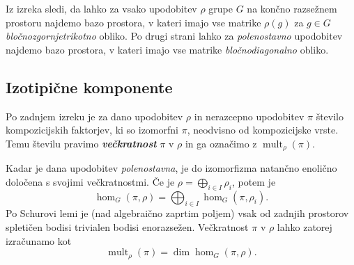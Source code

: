 \documentclass[11pt]{book}
\DeclareMathOperator\mult{mult}
\def\definicija{\color{rdeca}\bf\em}
\theoremstyle{definition}
\theoremstyle{zgled}
\theoremstyle{odprtproblem}
\theoremstyle{domacanaloga}
\theoremstyle{izrek}
\begin{document}
Iz izreka sledi, da lahko za vsako upodobitev $\rho$ grupe $G$ na končno razsežnem prostoru najdemo bazo prostora, v kateri imajo vse matrike $\rho(g)$ za $g \in G$ \emph{bločnozgornjetrikotno} obliko. Po drugi strani lahko za \emph{polenostavno} upodobitev najdemo bazo prostora, v kateri imajo vse matrike \emph{bločnodiagonalno} obliko.

\subsection{Izotipične komponente}

Po zadnjem izreku je za dano upodobitev $\rho$ in nerazcepno upodobitev $\pi$ število kompozicijskih faktorjev, ki so izomorfni $\pi$, neodvisno od kompozicijske vrste. Temu številu pravimo {\definicija večkratnost} $\pi$ v $\rho$ in ga označimo z $\mult_{\rho}(\pi)$. 

Kadar je dana upodobitev \emph{polenostavna}, je do izomorfizma natančno enolično določena s svojimi večkratnostmi. Če je $\rho = \bigoplus_{i \in I} \rho_i$, potem je
\[
    \hom_G(\pi, \rho) = \bigoplus_{i \in I} \hom_G(\pi, \rho_i).
\]
Po Schurovi lemi je (nad algebraično zaprtim poljem) vsak od zadnjih prostorov spletičen bodisi trivialen bodisi enorazsežen. Večkratnost $\pi$ v $\rho$ lahko zatorej izračunamo kot
\[
    \displaystyle \mult_{\rho}(\pi) = \dim \hom_G(\pi, \rho).
\]
\end{document}
